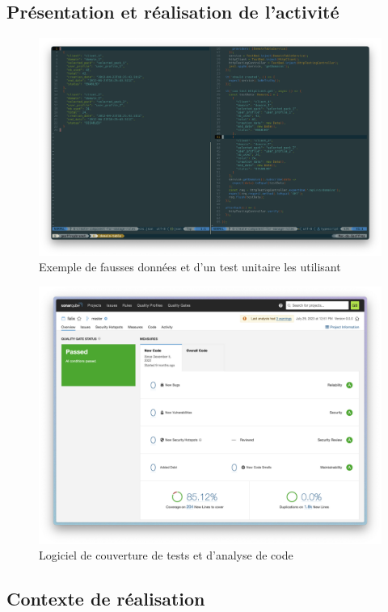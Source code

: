 \documentclass[a4paper, 11pt]{report}
\begin{document}
\subsection{Présentation et réalisation de l'activité}
  \begin{figure}[H]
      \centering
      \includegraphics[scale=0.35,center]{screenshots/felix-test.png}
      \caption{Exemple de fausses données et d'un test unitaire les utilisant}
  \end{figure}
  \begin{figure}[H]
      \centering
      \includegraphics[scale=0.35,center]{screenshots/felix-sonar.png}
      \caption{Logiciel de couverture de tests et d'analyse de code}
  \end{figure}
\subsection{Contexte de réalisation}
\end{document}
